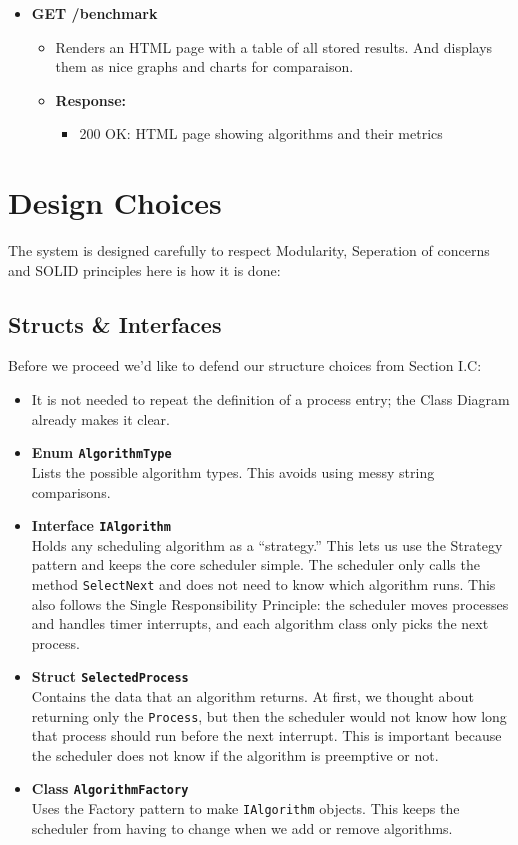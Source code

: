 \documentclass[conference]{IEEEtran}
\begin{document}
\begin{itemize}
  \item \textbf{GET /benchmark}  
    \begin{itemize}
      \item Renders an HTML page with a table of all stored results. And displays them as nice graphs and charts for comparaison.
      \item \textbf{Response:}
      \begin{itemize}
        \item 200 OK: HTML page showing algorithms and their metrics  
      \end{itemize}
    \end{itemize}
\end{itemize}


\section{Design Choices}
The system is designed carefully to respect Modularity, Seperation of concerns and SOLID principles here is how it is done:
\subsection{Structs \& Interfaces}
Before we proceed we'd like to defend our structure choices from Section I.C:
\begin{itemize}
  \item It is not needed to repeat the definition of a process entry; the Class Diagram already makes it clear.
  \item \textbf{Enum \texttt{AlgorithmType}}\\
    Lists the possible algorithm types. This avoids using messy string comparisons.
  \item \textbf{Interface \texttt{IAlgorithm}}\\
    Holds any scheduling algorithm as a “strategy.” This lets us use the Strategy pattern and keeps the core scheduler simple. The scheduler only calls the method \texttt{SelectNext} and does not need to know which algorithm runs. This also follows the Single Responsibility Principle: the scheduler moves processes and handles timer interrupts, and each algorithm class only picks the next process.
  \item \textbf{Struct \texttt{SelectedProcess}}\\
    Contains the data that an algorithm returns. At first, we thought about returning only the \texttt{Process}, but then the scheduler would not know how long that process should run before the next interrupt. This is important because the scheduler does not know if the algorithm is preemptive or not.
  \item \textbf{Class \texttt{AlgorithmFactory}}\\
    Uses the Factory pattern to make \texttt{IAlgorithm} objects. This keeps the scheduler from having to change when we add or remove algorithms.
\end{itemize}
\end{document}
